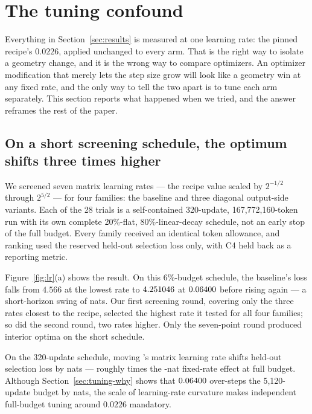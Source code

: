 \section{The tuning confound}
\label{sec:tuning}

Everything in Section~\ref{sec:results} is measured at one learning rate: the
pinned recipe's $0.0226$, applied unchanged to every arm. That is the right way
to isolate a geometry change, and it is the wrong way to compare optimizers. An
optimizer modification that merely lets the step size grow will look like a
geometry win at any fixed rate, and the only way to tell the two apart is to
tune each arm separately. This section reports what happened when we tried, and
the answer reframes the rest of the paper.

\subsection{On a short screening schedule, the optimum shifts three times higher}

We screened seven matrix learning rates --- the recipe value scaled by
$2^{-1/2}$ through $2^{5/2}$ --- for four families: the baseline and three
diagonal output-side variants. Each of the 28 trials is a self-contained
320-update, 167{,}772{,}160-token run with its own complete 20\%-flat,
80\%-linear-decay schedule, not an early stop of the full budget. Every family
received an identical token allowance, and ranking used the reserved held-out
selection loss only, with C4 held back as a reporting metric.

Figure~\ref{fig:lr}(a) shows the result. On this 6\%-budget schedule, the
baseline's loss falls from $4.566$ at the lowest rate to $4.251046{}$ at
$0.06400{}$ before rising again --- a short-horizon swing of
\lrHeadroom{} nats. Our first screening round, covering only the three rates
closest to the recipe, selected the highest rate it tested for all four
families; so did the second round, two rates higher. Only the seven-point round
produced interior optima on the short schedule.

\begin{finding}
On the 320-update schedule, moving 's matrix learning rate shifts
held-out selection loss by \lrHeadroom{} nats --- roughly \lrHeadroomRatio{}
times the \mlpdiagselmag{}-nat fixed-rate effect at full budget. Although
Section~\ref{sec:tuning-why} shows that $0.06400{}$ over-steps the
5{,}120-update budget by \waveTwelveMuontSelDiffMag{} nats, the scale of
learning-rate curvature makes independent full-budget tuning around $0.0226$
mandatory.
\end{finding}

